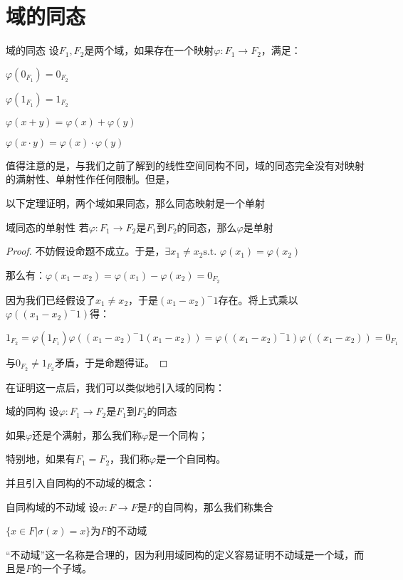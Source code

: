 \documentclass[12pt, a4paper, oneside, UTF8]{ctexbook}
\begin{document}
	\section{域的同态}
		\begin{defn}{域的同态}
			设$F_1,F_2$是两个域，如果存在一个映射$\varphi:F_1 \rightarrow F_2$，满足：
			
			 $\varphi (0_{F_1}) = 0_{F_2}$
			
			 $\varphi (1_{F_1}) = 1_{F_2}$
			
			 $\varphi (x+y) = \varphi (x)+\varphi (y)$
			
			 $\varphi (x\cdot y) = \varphi (x) \cdot \varphi (y)$
		\end{defn}
		值得注意的是，与我们之前了解到的线性空间同构不同，域的同态完全没有对映射的满射性、单射性作任何限制。但是，
		
		以下定理证明，两个域如果同态，那么同态映射是一个单射
		\begin{them}{域同态的单射性}{}
			若$\varphi : F_1 \rightarrow F_2$是$F_1$到$F_2$的同态，那么$\varphi$是单射
		\end{them}
		\begin{proof}
			不妨假设命题不成立。于是，$\exists x_1 \neq x_2 \text{s.t. }\varphi(x_1)=\varphi(x_2)$
			
			那么有：$\varphi (x_1-x_2)=\varphi (x_1)-\varphi (x_2) = 0_{F_2}$
			
			因为我们已经假设了$x_1 \neq x_2$，于是$(x_1-x_2)^-1$存在。将上式乘以$\varphi\left((x_1-x_2)^-1\right)$得：
			
			$1_{F_2} = \varphi (1_{F_1}) \varphi\left((x_1-x_2)^-1 (x_1-x_2)\right) = \varphi\left((x_1-x_2)^-1\right)\varphi\left((x_1-x_2)\right)=0_{F_1}$
			
			与$0_{F_2} \neq 1_{F_2}$矛盾，于是命题得证。
		\end{proof}
		在证明这一点后，我们可以类似地引入域的同构：
		\begin{defn}{域的同构}{}
			设$\varphi : F_1 \rightarrow F_2$是$F_1$到$F_2$的同态
			
			如果$\varphi$还是个满射，那么我们称$\varphi$是一个同构；
			
			特别地，如果有$F_1=F_2$，我们称$\varphi$是一个自同构。
		\end{defn}
		并且引入自同构的不动域的概念：
		\begin{defn}{自同构域的不动域}{}
			设$\sigma : F \rightarrow F$是$F$的自同构，那么我们称集合
			
			$\{x \in F | \sigma(x) = x\}$为$F$的不动域
		\end{defn}
		“不动域”这一名称是合理的，因为利用域同构的定义容易证明不动域是一个域，而且是$F$的一个子域。
\ifx\allfiles\undefined
\end{document}
